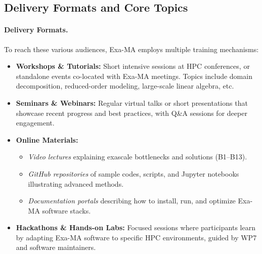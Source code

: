\subsection{Delivery Formats and Core Topics}

\paragraph{Delivery Formats.}
To reach these various audiences, Exa-MA employs multiple training mechanisms:
\begin{itemize}
    \item \textbf{Workshops \& Tutorials:} 
    Short intensive sessions at HPC conferences, or standalone events co-located with Exa-MA meetings. Topics include domain decomposition, reduced-order modeling, large-scale linear algebra, etc.
    \item \textbf{Seminars \& Webinars:}
    Regular virtual talks or short presentations that showcase recent progress and best practices, with Q\&A sessions for deeper engagement.
    \item \textbf{Online Materials:}
    \begin{itemize}
        \item \textit{Video lectures} explaining exascale bottlenecks and solutions (B1--B13).
        \item \textit{GitHub repositories} of sample codes, scripts, and Jupyter notebooks illustrating advanced methods.
        \item \textit{Documentation portals} describing how to install, run, and optimize Exa-MA software stacks.
    \end{itemize}
    \item \textbf{Hackathons \& Hands-on Labs:}
    Focused sessions where participants learn by adapting Exa-MA software to specific HPC environments, guided by WP7 and software maintainers.
\end{itemize}

